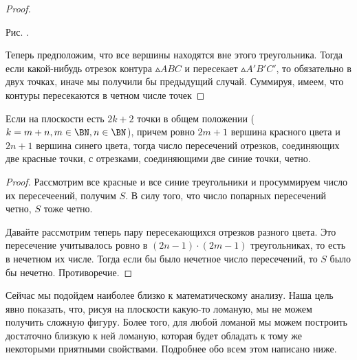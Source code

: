 \begin{statement}
\begin{proof}
\begin{paracol}{2}
\begin{center}
\end{center}
\begin{center}
	\small Рис. \images. 
\end{center}
\end{paracol}	
	
	Теперь предположим, что все вершины находятся вне этого треугольника. Тогда если какой-нибудь отрезок контура $\vartriangle ABC$ и пересекает $\vartriangle A'B'C'$, то обязательно в двух точках, иначе мы получили бы предыдущий случай. Суммируя, имеем, что контуры пересекаются в четном числе точек 
\end{proof} 
\end{statement}

\begin{consequence}
	Если на плоскости есть $2k + 2$ точки в общем положении ($k = m + n, m \in \BN, n \in \BN$), причем ровно $2m + 1$ вершина красного цвета и $2n + 1$ вершина синего цвета, тогда число пересечений отрезков, соединяющих две красные точки, с отрезками, соединяющими две синие точки, четно.
	
\begin{proof}
	Рассмотрим все красные и все синие треугольники и просуммируем число их пересечеений, получим $S$. В силу того, что число попарных пересечений четно, $S$ тоже четно.
	
	Давайте рассмотрим теперь пару пересекающихся отрезков разного цвета. Это пересечение учитывалось ровно в $(2n-1) \cdot (2m-1)$ треугольниках, то есть в нечетном их числе. Тогда если бы было нечетное число пересечений, то $S$ было бы нечетно. Противоречие.
\end{proof}
\end{consequence}


	Сейчас мы подойдем наиболее близко к математическому анализу. Наша цель явно показать, что, рисуя на плоскости какую-то ломаную, мы не можем получить сложную фигуру. Более того, для любой ломаной мы можем построить достаточно близкую к ней ломаную, которая будет обладать к тому же некоторыми приятными свойствами. Подробнее обо всем этом написано ниже. 